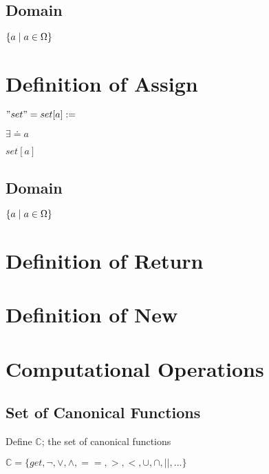 \documentclass[11pt]{article}
\begin{document}
\subsection{Domain}
\begin{center}
$
\{ a \hspace{1mm} | \hspace{1mm} a \in \Omega\}
$
\end{center}



\section{Definition of Assign}
\begin{center}
$
"set" = set[a] :=
$
\end{center}
\vspace{1mm}
$\exists \doteq a$
\begin{center}
$
set[a]
$
\end{center}
\subsection{Domain}
\begin{center}
$
\{ a \hspace{1mm} | \hspace{1mm} a \in \Omega\}
$
\end{center}



\section{Definition of Return}



\section{Definition of New}




\section{Computational Operations}






\subsection{Set of Canonical Functions}
Define $\mathbb{C}$; the set of canonical functions
\begin{center}
$
\mathbb{C} = \{get,\lnot,\lor,\land,==,>,<,\cup,\cap,||,...\}
$
\end{center}
\end{document}
